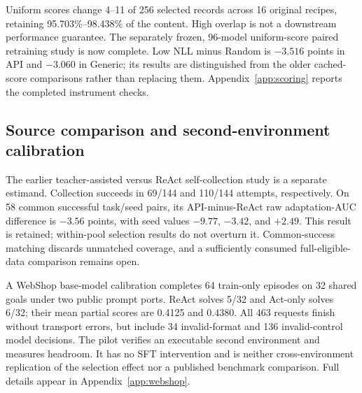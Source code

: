 Uniform scores change 4--11 of 256 selected records across 16 original recipes, retaining 95.703\%--98.438\% of the content. High overlap is not a downstream performance guarantee. The separately frozen, 96-model uniform-score paired retraining study is now complete. Low NLL minus Random is $-3.516$ points in API and $-3.060$ in Generic; its results are distinguished from the older cached-score comparisons rather than replacing them. Appendix~\ref{app:scoring} reports the completed instrument checks.

\subsection{Source comparison and second-environment calibration}
\label{sec:scope}
The earlier teacher-assisted versus ReAct self-collection study is a separate estimand. Collection succeeds in 69/144 and 110/144 attempts, respectively. On 58 common successful task/seed pairs, its API-minus-ReAct raw adaptation-AUC difference is $-3.56$ points, with seed values $-9.77$, $-3.42$, and $+2.49$. This result is retained; within-pool selection results do not overturn it. Common-success matching discards unmatched coverage, and a sufficiently consumed full-eligible-data comparison remains open.

A WebShop base-model calibration completes 64 train-only episodes on 32 shared goals under two public prompt ports. ReAct solves 5/32 and Act-only solves 6/32; their mean partial scores are 0.4125 and 0.4380. All 463 requests finish without transport errors, but include 34 invalid-format and 136 invalid-control model decisions. The pilot verifies an executable second environment and measures headroom. It has no SFT intervention and is neither cross-environment replication of the selection effect nor a published benchmark comparison. Full details appear in Appendix~\ref{app:webshop}.
